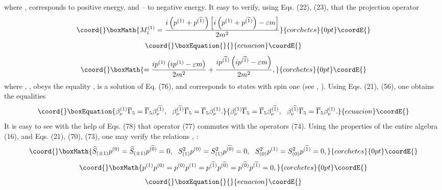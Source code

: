 \documentclass[a4paper,12pt]{article}
\begin{document}
where \coordHE{}, \coordHE{}
corresponds to positive energy, and  \coordHE{} -- to
negative energy. It easy to verify, using Eqs. (22), (23), that
the projection operator
\[\coord{}\boxMath{
M^{(1)}_\varepsilon =\frac{i\left(
p^{(1)}+p^{(\widetilde{1})}\right)\left[ i\left( p^{(1)}+
p^{(\widetilde{1})}\right) - \varepsilon m\right]}{2m^2}
}{corchetes}{0pt}\coordE{}\]
\vspace{-8mm}
\begin{equation}\coord{}\boxEquation{  \label{77}
}{  }{ecuacion}\coordE{}\end{equation}
\vspace{-8mm}
\[\coord{}\boxMath{
=\frac{i p^{(1)}\left( i p^{(1)} - \varepsilon
m\right)}{2m^2}+\frac{i p^{(\widetilde{1})}\left( i
p^{(\widetilde{1})} - \varepsilon m\right)}{2m^2} ,
}{corchetes}{0pt}\coordE{}\]
where \coordHE{}, \coordHE{}, obeys the equality
\coordHE{}, is a solution of
Eq. (76), and corresponds to states with spin one (see
\cite{Kruglov1}, \cite{monogr}). Using Eqs. (21), (56), one
obtains the equalities
\begin{equation}\coord{}\boxEquation{
 \beta _\nu
^{(1)}\overline{\Gamma }_5=\overline{\Gamma }_5 \beta _\nu
^{(\widetilde{1})} ,~~\beta _\nu
^{(\widetilde{1})}\overline{\Gamma }_5=\overline{\Gamma }_5 \beta
_\nu ^{(1)} .
   \label{78}
}{
 \beta _\nu
^{(1)}\overline{\Gamma }_5=\overline{\Gamma }_5 \beta _\nu
^{(\widetilde{1})} ,~~\beta _\nu
^{(\widetilde{1})}\overline{\Gamma }_5=\overline{\Gamma }_5 \beta
_\nu ^{(1)} .
   }{ecuacion}\coordE{}\end{equation}
It is easy to see with the help of Eqs. (78) that operator (77)
commutes with the operators (74). Using the properties of the
entire algebra (16), and Eqs. (21), (70), (73), one may verify the
relations \cite{Kruglov1}, \cite{monogr}:
\[\coord{}\boxMath{
\widehat{S}_{(\pm 1)}p^{( 0)}=\widehat{S}_{(\pm
1)}p^{(\widetilde{0})}=0 ,~~S_{(1)}^2 p^{(0)}=S_{(1)}^2
p^{(\widetilde{0})}=0 ,~~S_{(0)}^2 p^{(1)}=S_{(0)}^2
p^{(\widetilde{1})}=0 ,
}{corchetes}{0pt}\coordE{}\]
\[\coord{}\boxMath{
p^{(1)}p^{(0)}=p^{(0)}p^{(1)}=p^{(\widetilde{1})}p^{(\widetilde{0})}
=p^{(\widetilde{0})}p^{(\widetilde{1})}=0 ,
}{corchetes}{0pt}\coordE{}\]
\vspace{-7mm}
\begin{equation}\coord{}\boxEquation{
\label{79}
}{
}{ecuacion}\coordE{}\end{equation}
\end{document}
